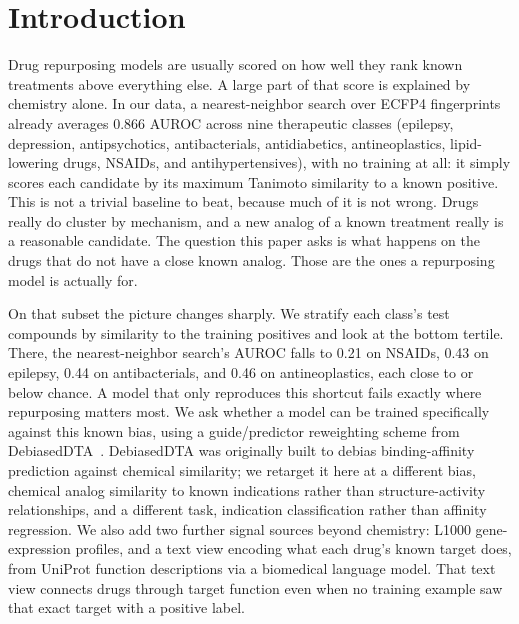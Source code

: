 \documentclass{llncs}
\begin{document}
\begin{abstract}
Two further findings support the paper's broader case for evaluation care in this setting, though neither is the paper's main result. Adapting two debiasing methods from the literature, DRDM and TAPB, to this task shows our model still holds the best point estimate. But the comparison also surfaces that one of them looks strong mainly because of joint multi-indication training, not its own correction, a transferable pitfall for anyone benchmarking an adapted debiasing baseline. Separately, a leakage audit justifies why literature about the drug itself cannot be used as a feature: PubMed abstracts predict a drug's eventual indication at 0.96 AUROC even before approval, almost entirely through mentions of other same-class drugs.
\end{abstract}

\section{Introduction}
Drug repurposing models are usually scored on how well they rank known treatments above everything else. A large part of that score is explained by chemistry alone. In our data, a nearest-neighbor search over ECFP4 fingerprints already averages 0.866 AUROC across nine therapeutic classes (epilepsy, depression, antipsychotics, antibacterials, antidiabetics, antineoplastics, lipid-lowering drugs, NSAIDs, and antihypertensives), with no training at all: it simply scores each candidate by its maximum Tanimoto similarity to a known positive. This is not a trivial baseline to beat, because much of it is not wrong. Drugs really do cluster by mechanism, and a new analog of a known treatment really is a reasonable candidate. The question this paper asks is what happens on the drugs that do not have a close known analog. Those are the ones a repurposing model is actually for.

On that subset the picture changes sharply. We stratify each class's test compounds by similarity to the training positives and look at the bottom tertile. There, the nearest-neighbor search's AUROC falls to 0.21 on NSAIDs, 0.43 on epilepsy, 0.44 on antibacterials, and 0.46 on antineoplastics, each close to or below chance. A model that only reproduces this shortcut fails exactly where repurposing matters most. We ask whether a model can be trained specifically against this known bias, using a guide/predictor reweighting scheme from DebiasedDTA~\cite{ozcelik2023debiaseddta}. DebiasedDTA was originally built to debias binding-affinity prediction against chemical similarity; we retarget it here at a different bias, chemical analog similarity to known indications rather than structure-activity relationships, and a different task, indication classification rather than affinity regression. We also add two further signal sources beyond chemistry: L1000 gene-expression profiles, and a text view encoding what each drug's known target does, from UniProt function descriptions via a biomedical language model. That text view connects drugs through target function even when no training example saw that exact target with a positive label.
\end{document}
